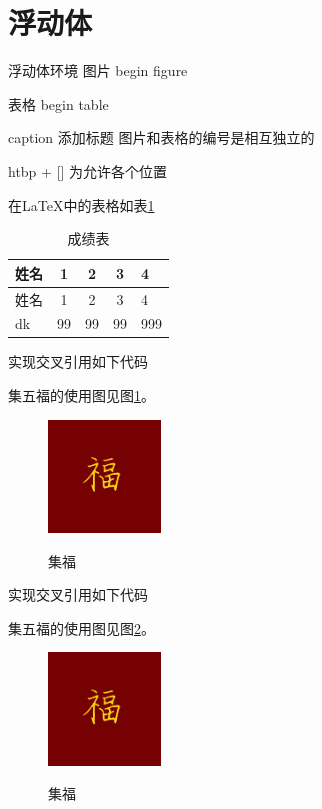 \documentclass[UTF8]{article}
\date{\today}
\begin{document}
	\section{浮动体}
	浮动体环境 图片 begin {figure}
		
	表格 begin {table}
	
	caption 添加标题  图片和表格的编号是相互独立的
	
	htbp   +  []  为允许各个位置
	
	在\LaTeX{}中的表格如表\ref{c}
	\begin{table}[htbp]
		\centering
		\begin{tabular}{l |c |c |c |p{0.5cm}|}%
			姓名 &1 &2 &3 &4\\
			\hline
			姓名 &1 &2 &3 &4\\
			\hline
			dk   &99 &99 &99 &999\\
		\end{tabular}
		\caption{成绩表}\label{c}
	\end{table}
	
	实现交叉引用如下代码
	
	集五福的使用图见图\ref{fig-fuu}。
	\begin{figure}[htbp]
		\centering
		\includegraphics[height=3cm]{fu}\\
		\caption{集福}\label{fig-fuu}
	\end{figure}
	
		实现交叉引用如下代码
	
	集五福的使用图见图\ref{fig-fuuu}。
	\begin{figure}[htbp]
		\centering
		\includegraphics[height=3cm]{fu}\\
		\caption{集福}\label{fig-fuuu}
	\end{figure}


		
	
	
	
\end{document}
